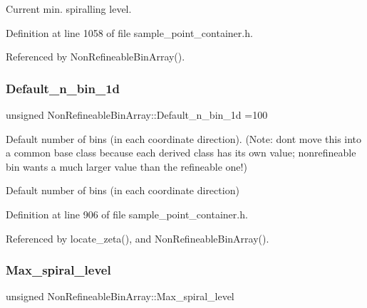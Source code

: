 Current min. spiralling level. 



Definition at line 1058 of file sample\+\_\+point\+\_\+container.\+h.



Referenced by Non\+Refineable\+Bin\+Array().

\mbox{\label{classNonRefineableBinArray_ab6a79a3d17b5b7958e1a669a3780333a}} 
\subsubsection{\texorpdfstring{Default\+\_\+n\+\_\+bin\+\_\+1d}{Default\_n\_bin\_1d}}
{\footnotesize\ttfamily unsigned Non\+Refineable\+Bin\+Array\+::\+Default\+\_\+n\+\_\+bin\+\_\+1d =100\hspace{0.3cm}{\ttfamily [static]}}



Default number of bins (in each coordinate direction). (Note\+: don\textquotesingle{}t move this into a common base class because each derived class has its own value; nonrefineable bin wants a much larger value than the refineable one!) 

Default number of bins (in each coordinate direction) 

Definition at line 906 of file sample\+\_\+point\+\_\+container.\+h.



Referenced by locate\+\_\+zeta(), and Non\+Refineable\+Bin\+Array().

\mbox{\label{classNonRefineableBinArray_a13dae71565c22468fa49cc91cd66ae04}} 
\subsubsection{\texorpdfstring{Max\+\_\+spiral\+\_\+level}{Max\_spiral\_level}}
{\footnotesize\ttfamily unsigned Non\+Refineable\+Bin\+Array\+::\+Max\+\_\+spiral\+\_\+level\hspace{0.3cm}{\ttfamily [private]}}



